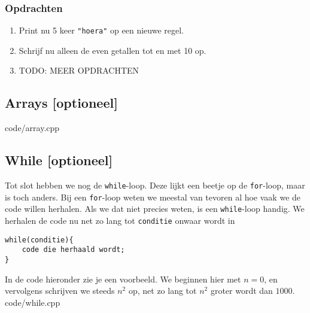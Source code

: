 \documentclass[12pt,a4paper]{article}
\newcommand{\code}{}
\newcommand{\icode}{\lstinline}
\begin{document}
\subsubsection{Opdrachten}
\begin{enumerate}
	\item
		Print nu 5 keer \icode{"hoera"} op een nieuwe regel.
	\item
		Schrijf nu alleen de even getallen tot en met 10 op.
	\item 
		TODO: MEER OPDRACHTEN
\end{enumerate}

\subsection{Arrays [optioneel]}
\code{code/array.cpp}

\subsection{While [optioneel]}
Tot slot hebben we nog de \icode{while}-loop. Deze lijkt een beetje op de \icode{for}-loop, maar is toch anders. Bij een \icode{for}-loop weten we meestal van tevoren al hoe vaak we de code willen herhalen. Als we dat niet precies weten, is een \icode{while}-loop handig. We herhalen de code nu net zo lang tot \icode{conditie} onwaar wordt in
\begin{lstlisting}
while(conditie){
	code die herhaald wordt;
}
\end{lstlisting}
In de code hieronder zie je een voorbeeld. We beginnen hier met $n=0$, en vervolgens schrijven we steeds $n^2$ op, net zo lang tot $n^2$ groter wordt dan $1000$.
\code{code/while.cpp}
\end{document}
